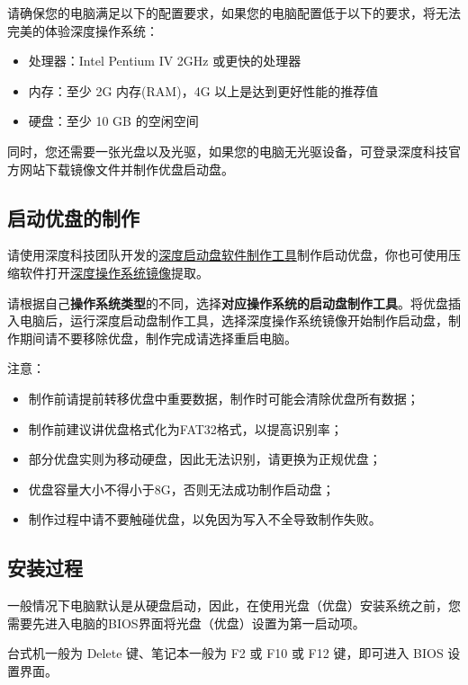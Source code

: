 \documentclass[doctor,openright,twoside]{sjtuthesis}
\providecommand{\tightlist}{%
    \setlength{\itemsep}{0pt}\setlength{\parskip}{0pt}}
\theoremstyle{plain}
\theoremstyle{definition}
\theoremstyle{remark}
\theoremstyle{ocrenumbox}
\theoremstyle{plain}
\begin{document}
请确保您的电脑满足以下的配置要求，如果您的电脑配置低于以下的要求，将无法完美的体验深度操作系统：

\begin{itemize}
\tightlist
\item
  处理器：Intel Pentium IV 2GHz 或更快的处理器
\item
  内存：至少 2G 内存(RAM)，4G 以上是达到更好性能的推荐值
\item
  硬盘：至少 10 GB 的空闲空间
\end{itemize}

同时，您还需要一张光盘以及光驱，如果您的电脑无光驱设备，可登录深度科技官方网站下载镜像文件并制作优盘启动盘。

\subsection{启动优盘的制作}

请使用深度科技团队开发的\href{https://www.deepin.org/original/deepin-boot-maker/}{深度启动盘软件制作工具}制作启动优盘，你也可使用压缩软件打开\href{https://www.deepin.org/download/}{深度操作系统镜像}提取。

请根据自己\textbf{操作系统类型}的不同，选择\textbf{对应操作系统的启动盘制作工具}。将优盘插入电脑后，运行深度启动盘制作工具，选择深度操作系统镜像开始制作启动盘，制作期间请不要移除优盘，制作完成请选择重启电脑。

注意：

\begin{itemize}
\tightlist
\item
  制作前请提前转移优盘中重要数据，制作时可能会清除优盘所有数据；
\item
  制作前建议讲优盘格式化为FAT32格式，以提高识别率；
\item
  部分优盘实则为移动硬盘，因此无法识别，请更换为正规优盘；
\item
  优盘容量大小不得小于8G，否则无法成功制作启动盘；
\item
  制作过程中请不要触碰优盘，以免因为写入不全导致制作失败。
\end{itemize}

\subsection{安装过程}

一般情况下电脑默认是从硬盘启动，因此，在使用光盘（优盘）安装系统之前，您需要先进入电脑的BIOS界面将光盘（优盘）设置为第一启动项。

台式机一般为 Delete 键、笔记本一般为 F2 或 F10 或 F12 键，即可进入 BIOS
设置界面。
\end{document}
